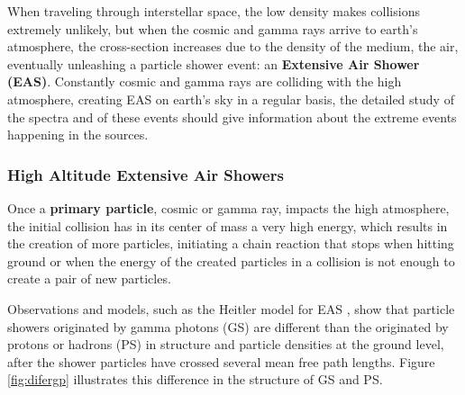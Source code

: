 \documentclass{article}
\begin{document}
When traveling through interstellar space, the low density makes collisions extremely unlikely, but when the cosmic and gamma rays arrive to earth's atmosphere, the cross-section increases due to the density of the medium, the air, eventually unleashing a particle shower event: an \textbf{Extensive Air Shower (EAS)}.  Constantly cosmic and gamma rays are colliding with the high atmosphere, creating EAS on earth's sky in a regular basis, the detailed study of the spectra and of these events should give information about the extreme events happening in the sources.
\subsubsection{High Altitude Extensive Air Showers}
Once a \textbf{primary particle}, cosmic or gamma ray, impacts the high atmosphere, the initial collision has in its center of mass a very high energy, which results in the creation of more particles, initiating a chain reaction that stops when hitting ground or when the energy of the created particles in a collision is not enough to create a pair of new particles.   

Observations and models, such as the Heitler model for EAS \cite{heitlerarticle},
show that particle showers originated by gamma photons (GS) are different than the originated by protons or hadrons (PS) in structure and particle densities at the ground level, after the shower particles have crossed several mean free path lengths. Figure \ref{fig:difergp} illustrates this difference in the structure of GS and PS.
\end{document}
